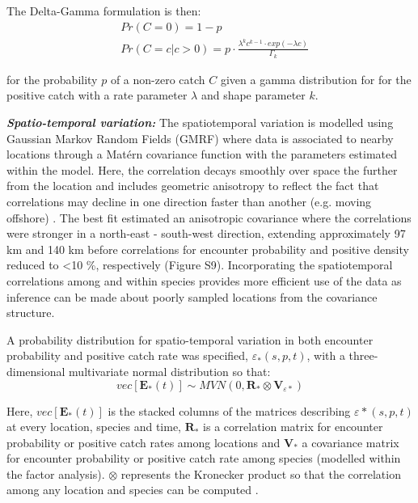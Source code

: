 \documentclass{nature}
\begin{document}
\begin{linenumbers}
The Delta-Gamma formulation is then:
\begin{equation}
	\begin{split}
	& Pr(C = 0) = 1 - p \\
	& Pr(C = c | c > 0) = p \cdot \frac{\lambda^{k}c^{k-1} \cdot exp(-\lambda c)}{\Gamma_{k}}
	\end{split}
\end{equation}

for the probability $p$ of a non-zero catch $C$ given a gamma distribution for
for the positive catch with a rate parameter $\lambda$ and shape parameter $k$.

\textbf{\textit{Spatio-temporal variation:}} The spatiotemporal variation is
modelled using Gaussian Markov Random Fields (GMRF) where data is associated to
nearby locations through a Matérn covariance function with the parameters
estimated within the model. Here, the correlation decays smoothly over space
the further from the location and includes geometric anisotropy to reflect the
fact that correlations may decline in one direction faster than another (e.g.
moving offshore) \cite{Thorson2013}.  The best fit estimated an anisotropic
covariance where the correlations were stronger in a north-east - south-west
direction, extending approximately 97 km and 140 km before correlations for
encounter probability and positive density reduced to \textless 10 \%,
respectively (Figure S9).  Incorporating the spatiotemporal correlations among
and within species provides more efficient use of the data as inference
can be made about poorly sampled locations from the covariance structure.

A probability distribution for spatio-temporal variation in both encounter
probability and positive catch rate was specified, $\varepsilon_{*}(s,p,t)$,
with a three-dimensional multivariate normal distribution so that:
	\begin{equation}
		vec[\mathbf{E}_{*}(t)] \sim MVN(0,\mathbf{R}_{*} \otimes
		\mathbf{V}_{{\varepsilon}{*}})
	\end{equation}

Here, $vec[\mathbf{E}_{*}(t)]$ is the stacked columns of the matrices
describing $\varepsilon{*}(s,p,t)$ at every location, species and time,
$\mathbf{R}_{*}$ is a correlation matrix for encounter probability or positive
catch rates among locations and $\mathbf{V}_{*}$ a covariance matrix for
encounter probability or positive catch rate among species (modelled within the
factor analysis). $\otimes$ represents the Kronecker product so that the
correlation among any location and species can be computed \cite{Thorson2017}.
		

\end{linenumbers}
\end{document}
